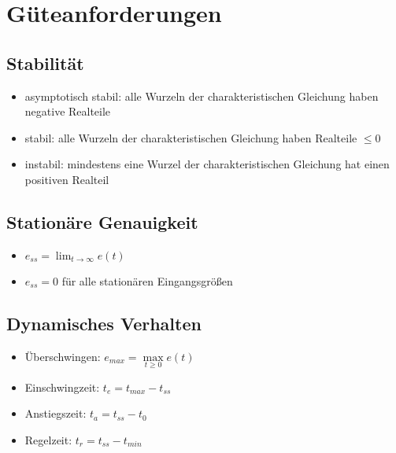 \documentclass[german]{latex4ei/latex4ei_sheet}
\begin{document}
\section{Güteanforderungen}
\begin{sectionbox}
    \subsection{Stabilität}
    \vspace{1mm}
    \begin{itemize}
        \item asymptotisch stabil: alle Wurzeln der charakteristischen Gleichung haben negative Realteile
        \item stabil: alle Wurzeln der charakteristischen Gleichung haben Realteile $\leq 0$
        \item instabil: mindestens eine Wurzel der charakteristischen Gleichung hat einen positiven Realteil
    \end{itemize}
    \subsection{Stationäre Genauigkeit}
    \vspace{1mm}
    \begin{itemize}
        \item $e_{ss} = \lim_{t \to \infty} e(t)$
        \item $e_{ss} = 0$ für alle stationären Eingangsgrößen
    \end{itemize}
    \subsection{Dynamisches Verhalten}
    \vspace{1mm}
    \begin{itemize}
        \item Überschwingen: $e_{max} = \max\limits_{t \geq 0} e(t)$
        \item Einschwingzeit: $t_e = t_{max} - t_{ss}$
        \item Anstiegszeit: $t_a = t_{ss} - t_0$
        \item Regelzeit: $t_r = t_{ss} - t_{min}$
    \end{itemize}

\end{sectionbox}
\end{document}
